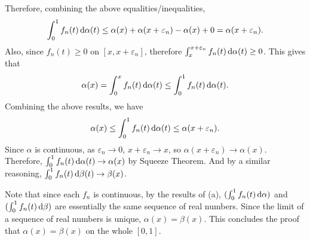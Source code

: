\documentclass[12pt]{article}
\begin{document}
\begin{fproof}[3(b)]
Therefore, combining the above equalities/inequalities,
\begin{align*}
    \int_{0}^{1} f_n(t) \mathop{}\!\mathrm{d}\alpha(t) \leq \alpha(x) + \alpha(x + \varepsilon_n) - \alpha(x) + 0 = \alpha(x+\varepsilon_n).
\end{align*}
Also, since \(f_n(t) \geq 0\) on \([x, x+ \varepsilon_n]\), therefore \(\int_{x}^{x+\varepsilon_n} f_n(t) \mathop{}\!\mathrm{d}\alpha(t) \geq 0\).
This gives that
\begin{align*}
    \alpha(x) = \int_{0}^{x} f_n(t) \mathop{}\!\mathrm{d}\alpha(t) \leq \int_{0}^{1} f_n(t) \mathop{}\!\mathrm{d}\alpha(t).
\end{align*}
Combining the above results, we have
\begin{align*}
    \alpha(x) \leq \int_{0}^{1} f_n(t) \mathop{}\!\mathrm{d}\alpha(t) \leq \alpha(x + \varepsilon_n).
\end{align*}
Since \(\alpha\) is continuous, as \(\varepsilon_n \to 0\), \(x + \varepsilon_n \to x\), so \(\alpha(x + \varepsilon_n) \to \alpha(x)\).
Therefore, \(\int_{0}^{1} f_n(t) \mathop{}\!\mathrm{d}\alpha(t) \to \alpha(x)\) by Squeeze Theorem.
And by a similar reasoning, \(\int_{0}^{1} f_n(t) \mathop{}\!\mathrm{d}\beta(t) \to \beta(x)\).

Note that since each \(f_n\) is continuous, by the results of (a), \((\int_{0}^{1} f_n(t) \mathop{}\!\mathrm{d}\alpha)\) and \((\int_{0}^{1} f_n(t) \mathop{}\!\mathrm{d}\beta)\) are essentially the same sequence of real numbers.
Since the limit of a sequence of real numbers is unique, \(\alpha(x) = \beta(x)\).
This concludes the proof that \(\alpha(x) = \beta(x)\) on the whole \([0,1]\).
\end{fproof}
\newpage

\begin{fproof}[4]

\end{fproof}
\newpage

\begin{fproof}[5]

\end{fproof}
\end{document}
